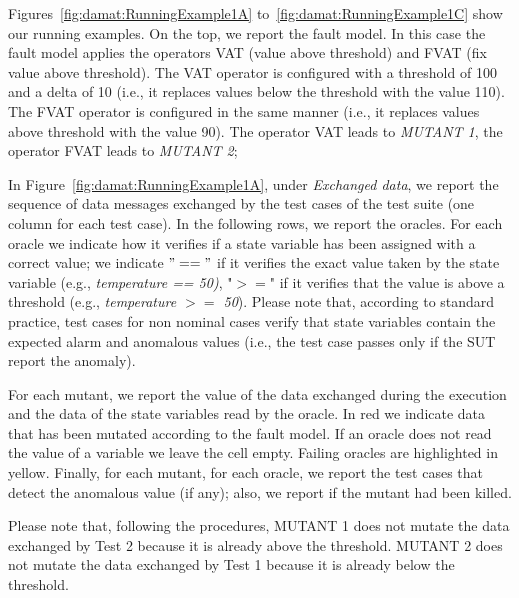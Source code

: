 Figures~\ref{fig:damat:RunningExample1A} to~\ref{fig:damat:RunningExample1C} show our running examples. On the top, we report the fault model. In this case the fault model applies the operators VAT (value above threshold) and FVAT (fix value above threshold). The VAT operator is configured with a threshold of 100 and a delta of 10 (i.e., it replaces values below the threshold with the value 110). The FVAT operator is configured in the same manner (i.e., it replaces values above threshold with the value 90). The operator VAT leads to \emph{MUTANT 1}, the operator FVAT leads to \emph{MUTANT 2}; 

In Figure~\ref{fig:damat:RunningExample1A}, under \emph{Exchanged data}, we report the sequence of data messages exchanged by the test cases of the test suite (one column for each test case).
In the following rows, we report the oracles. For each oracle we indicate how it verifies if a state variable has been assigned with a correct value; we indicate $"=="$ if it verifies the exact value taken by the state variable (e.g., \emph{temperature == 50)}, "$>=$" if it verifies that the value is above a threshold (e.g., \emph{temperature $>=$ 50}). Please note that, according to standard practice, test cases for non nominal cases verify that state variables contain the expected alarm and anomalous values (i.e., the test case passes only if the SUT report the anomaly).

For each mutant, we report the value of the data exchanged during the execution and the data of the state variables read by the oracle. In red we indicate data that has been mutated according to the fault model.
If an oracle does not read the value of a variable we leave the cell empty.
Failing oracles are highlighted in yellow.
Finally, for each mutant, for each oracle, we report the test cases that detect the anomalous value (if any); also, we report if the mutant had been killed.


Please note that, following the \APPR procedures, MUTANT 1 does not mutate the data exchanged by Test 2 because it is already above the threshold. MUTANT 2 does not mutate the data exchanged by Test 1 because it is already below the threshold.

